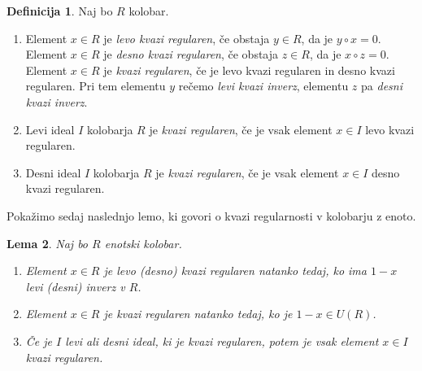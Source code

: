 \documentclass[a4paper, 12pt]{amsart}
\theoremstyle{definition} %
\newtheorem{definicija}{Definicija}[section]
\theoremstyle{plain} %
\newtheorem{lema}[definicija]{Lema}
\begin{document}
\begin{definicija}
Naj bo $R$ kolobar. 
\begin{enumerate}
\item Element $x\in R $ je \emph{levo kvazi regularen}, če obstaja $y\in R$, da je $y\circ x=0$. Element $x\in R$ je \emph{desno kvazi regularen}, če obstaja $z\in R$, da je $x\circ z = 0$. Element $x\in R$ je \emph{kvazi regularen}, če je levo kvazi regularen in desno kvazi regularen. Pri tem elementu $y$ rečemo \emph{levi kvazi inverz}, elementu $z$ pa \emph{desni kvazi inverz}.
\item Levi ideal $I$ kolobarja $R$ je \emph{kvazi regularen}, če je vsak element $x\in I$ levo kvazi regularen.
\item Desni ideal $I$ kolobarja $R$ je \emph{kvazi regularen}, če je vsak element $x\in I$ desno kvazi regularen.
\end{enumerate}
\end{definicija}

Pokažimo sedaj naslednjo lemo, ki govori o kvazi regularnosti v kolobarju z enoto.

\begin{lema}
\label{kvaziRegularen-enotskiR}
Naj bo $R$ enotski kolobar. 
\begin{enumerate}
\item Element $x\in R$ je levo (desno) kvazi regularen natanko tedaj, ko ima $1-x$ levi (desni) inverz v $R$.
\item Element $x\in R$ je kvazi regularen natanko tedaj, ko je $1-x \in U(R)$.
\item Če je $I$ levi ali desni ideal, ki je kvazi regularen, potem je vsak element $x\in I$ kvazi regularen.
\end{enumerate}
\end{lema}
\end{document}
